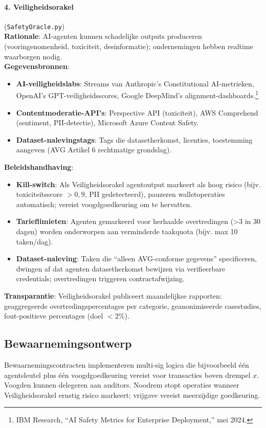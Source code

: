 \documentclass[11pt]{article}
\begin{document}
\paragraph{4. Veiligheidsorakel} (\texttt{SafetyOracle.py})\\
\textbf{Rationale}: AI-agenten kunnen schadelijke outputs produceren (vooringenomenheid, toxiciteit, desinformatie); ondernemingen hebben realtime waarborgen nodig.\\
\textbf{Gegevensbronnen}:
\begin{itemize}[noitemsep]
  \item \textbf{AI-veiligheidslabs}: Streams van Anthropic's Constitutional AI-metrieken, OpenAI's GPT-veiligheidsscores, Google DeepMind's alignment-dashboards.\footnote{IBM Research, ``AI Safety Metrics for Enterprise Deployment,'' mei 2024.}
  \item \textbf{Contentmoderatie-API's}: Perspective API (toxiciteit), AWS Comprehend (sentiment, PII-detectie), Microsoft Azure Content Safety.
  \item \textbf{Dataset-nalevingstags}: Tags die datasetherkomst, licenties, toestemming aangeven (AVG Artikel 6 rechtmatige grondslag).
\end{itemize}
\textbf{Beleidshandhaving}:
\begin{itemize}[noitemsep]
  \item \textbf{Kill-switch}: Als Veiligheidsorakel agentoutput markeert als hoog risico (bijv. toxiciteitsscore $>0,9$, PII gedetecteerd), pauzeren walletoperaties automatisch; vereist voogdgoedkeuring om te hervatten.
  \item \textbf{Tarieflimieten}: Agenten gemarkeerd voor herhaalde overtredingen (>3 in 30 dagen) worden onderworpen aan verminderde taakquota (bijv. max 10 taken/dag).
  \item \textbf{Dataset-naleving}: Taken die ``alleen AVG-conforme gegevens'' specificeren, dwingen af dat agenten datasetherkomst bewijzen via verifieerbare credentials; overtredingen triggeren contractafwijzing.
\end{itemize}
\textbf{Transparantie}: Veiligheidsorakel publiceert maandelijkse rapporten: geaggregeerde overtredingspercentages per categorie, geanonimiseerde casestudies, fout-positieve percentages (doel $<2\%$).

\subsection{Bewaarnemingsontwerp}
Bewaarnemingscontracten implementeren multi-sig logica die bijvoorbeeld één agentsleutel plus één voogdgoedkeuring vereist voor transacties boven drempel $x$. Voogden kunnen delegeren aan auditors. Noodrem stopt operaties wanneer Veiligheidsorakel ernstig risico markeert; vrijgave vereist meerzijdige goedkeuring.
\end{document}

